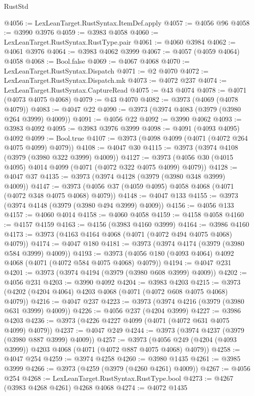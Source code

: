 \begin{lexlean}{RustStd}
\begin{coremodule}
@4056 := LexLeanTarget.RustSyntax.ItemDef.apply
@4057 := @4056 @96
@4058 := @3990 @3976
@4059 := @3983 @4058
@4060 := LexLeanTarget.RustSyntax.RustType.pair
@4061 := @4060 @3984
@4062 := @4061 @3976
@4064 := @3983 @4062 @3999
@4067 := @4057 (@4059 @4064) @4058
@4068 := Bool.false
@4069 := @4067 @4068
@4070 := LexLeanTarget.RustSyntax.Dispatch
@4071 := @2 @4070
@4072 := LexLeanTarget.RustSyntax.Dispatch.mk
@4073 := @4072 @237
@4074 := LexLeanTarget.RustSyntax.CaptureRead
@4075 := @43 @4074
@4078 := @4071 (@4073 @4075 @4068)
@4079 := @43 @4070
@4082 := @3973 (@4069 (@4078 @4079))
@4083 := @4047 @22
@4090 := @3973 (@3974 @4083 (@3979 (@3980 @264 @3999) @4009))
@4091 := @4056 @22
@4092 := @3990 @4062
@4093 := @3983 @4092
@4095 := @3983 @3976 @3999
@4098 := @4091 (@4093 @4095) @4092
@4099 := Bool.true
@4107 := @3973 (@4098 @4099 (@4071 (@4072 @264 @4075 @4099) @4079))
@4108 := @4047 @30
@4115 := @3973 (@3974 @4108 (@3979 (@3980 @322 @3999) @4009))
@4127 := @3973 (@4056 @30 (@4015 @4095) @4014 @4099 (@4071 (@4072 @322 @4075 @4099) @4079))
@4128 := @4047 @37
@4135 := @3973 (@3974 @4128 (@3979 (@3980 @348 @3999) @4009))
@4147 := @3973 (@4056 @37 (@4059 @4095) @4058 @4068 (@4071 (@4072 @348 @4075 @4068) @4079))
@4148 := @4047 @133
@4155 := @3973 (@3974 @4148 (@3979 (@3980 @494 @3999) @4009))
@4156 := @4056 @133
@4157 := @4060 @4014
@4158 := @4060 @4058
@4159 := @4158 @4058
@4160 := @4157 @4159
@4163 := @4156 (@3983 @4160 @3999)
@4164 := @3986 @4160
@4173 := @3973 (@4163 @4164 @4068 (@4071 (@4072 @494 @4075 @4068) @4079))
@4174 := @4047 @180
@4181 := @3973 (@3974 @4174 (@3979 (@3980 @584 @3999) @4009))
@4193 := @3973 (@4056 @180 (@4093 @4064) @4092 @4068 (@4071 (@4072 @584 @4075 @4068) @4079))
@4194 := @4047 @231
@4201 := @3973 (@3974 @4194 (@3979 (@3980 @608 @3999) @4009))
@4202 := @4056 @231
@4203 := @3990 @4092
@4204 := @3983 @4203
@4215 := @3973 (@4202 (@4204 @4064) @4203 @4068 (@4071 (@4072 @608 @4075 @4068) @4079))
@4216 := @4047 @237
@4223 := @3973 (@3974 @4216 (@3979 (@3980 @631 @3999) @4009))
@4226 := @4056 @237 (@4204 @3999)
@4227 := @3986 @4203
@4236 := @3973 (@4226 @4227 @4099 (@4071 (@4072 @631 @4075 @4099) @4079))
@4237 := @4047 @249
@4244 := @3973 (@3974 @4237 (@3979 (@3980 @887 @3999) @4009))
@4257 := @3973 (@4056 @249 (@4204 (@4093 @3999)) @4203 @4068 (@4071 (@4072 @887 @4075 @4068) @4079))
@4258 := @4047 @254
@4259 := @3974 @4258
@4260 := @3980 @1435
@4261 := @3985 @3999
@4266 := @3973 (@4259 (@3979 (@4260 @4261) @4009))
@4267 := @4056 @254
@4268 := LexLeanTarget.RustSyntax.RustType.bool
@4273 := @4267 (@3983 @4268 @4261) @4268 @4068
@4274 := @4072 @1435

\end{coremodule}
\end{lexlean}
